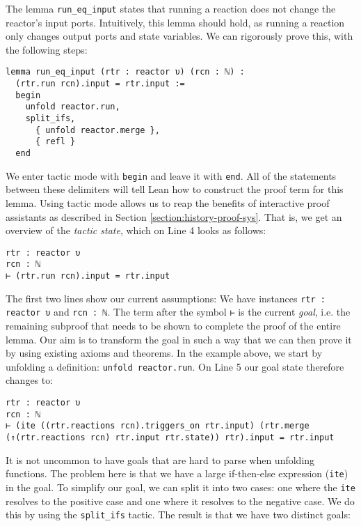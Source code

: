 The lemma \lstinline{run_eq_input} states that running a reaction does not change the reactor's input ports.
Intuitively, this lemma should hold, as running a reaction only changes output ports and state variables. 
We can rigorously prove this, with the following steps:

\begin{lstlisting}
lemma run_eq_input (rtr : reactor υ) (rcn : ℕ) : 
  (rtr.run rcn).input = rtr.input :=
  begin
    unfold reactor.run, 
    split_ifs,
      { unfold reactor.merge },
      { refl }
  end
\end{lstlisting}
\lstset{numbers=none, xleftmargin=0em}

\noindent We enter tactic mode with \verb|begin| and leave it with \verb|end|.
All of the statements between these delimiters will tell Lean how to construct the proof term for this lemma.
Using tactic mode allows us to reap the benefits of interactive proof assistants as described in Section \ref{section:history-proof-sys}.
That is, we get an overview of the \emph{tactic state}, which on Line 4 looks as follows:

\begin{lstlisting}
rtr : reactor υ
rcn : ℕ
⊢ (rtr.run rcn).input = rtr.input
\end{lstlisting}

\noindent The first two lines show our current assumptions: 
We have instances \lstinline{rtr : reactor υ} and \lstinline{rcn : ℕ}.
The term after the symbol \lstinline{⊢} is the current \emph{goal}, i.e. the remaining subproof that needs to be shown to complete the proof of the entire lemma.
Our aim is to transform the goal in such a way that we can then prove it by using existing axioms and theorems.
In the example above, we start by unfolding a definition: \lstinline{unfold reactor.run}.
On Line 5 our goal state therefore changes to:

\begin{lstlisting}
rtr : reactor υ
rcn : ℕ
⊢ (ite ((rtr.reactions rcn).triggers_on rtr.input) (rtr.merge (⇑(rtr.reactions rcn) rtr.input rtr.state)) rtr).input = rtr.input
\end{lstlisting}

\noindent It is not uncommon to have goals that are hard to parse when unfolding functions.
The problem here is that we have a large if-then-else expression (\lstinline{ite}) in the goal.
To simplify our goal, we can split it into two cases: one where the \lstinline{ite} resolves to the positive case and one where it resolves to the negative case.
We do this by using the \lstinline{split_ifs} tactic. 
The result is that we have two distinct goals:

